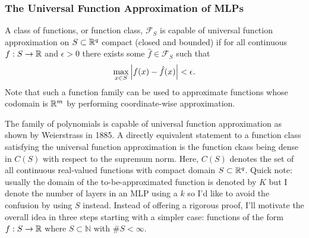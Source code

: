 \documentclass[11pt]{article}
\begin{document}
\subsubsection{The Universal Function Approximation of MLPs}
\label{subsubsec:universal_function_approximation_theorem}
 A class of functions, or function class, $\mathcal{F}_S$ is capable of universal function approximation on $S\subset\mathbb{R}^q$ compact (closed and bounded) if for all continuous $f:S\to\mathbb{R}$ and $\epsilon>0$ there exists some $\hat{f}\in\mathcal{F}_S$ such that
$$
\max_{x\in S}\left|f(x)-\hat{f}(x)\right|<\epsilon.
$$
Note that such a function family can be used to approximate functions whose codomain is $\mathbb{R}^m$ by performing coordinate-wise approximation. 

The family of polynomials is capable of universal function approximation as shown by Weierstrass in 1885. A directly equivalent statement to a function class satisfying the universal function approximation is the function ckass being dense in $C(S)$ with respect to the supremum norm. Here, $C(S)$ denotes the set of all continuous real-valued functions with compact domain $S\subset\mathbb{R}^q$. Quick note: usually the domain of the to-be-approximated function is denoted by $K$ but I denote the number of layers in an MLP using a $k$ so I'd like to avoid the confusion by using $S$ instead. Instead of offering a rigorous proof, I'll motivate the overall idea in three steps starting with a simpler case: functions of the form $f:S\to\mathbb{R}$ where $S\subset\mathbb{N}$ with $\#S<\infty$.
\end{document}
